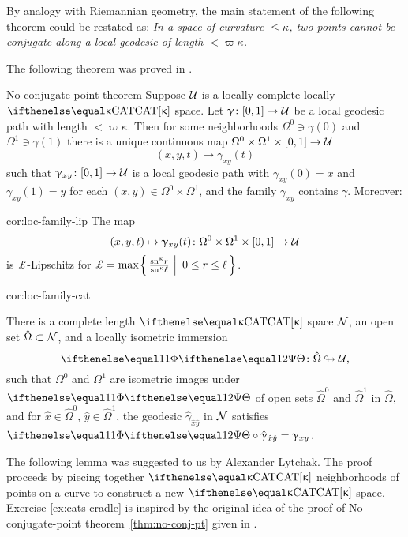 By analogy with Riemannian geometry, the main statement of the following theorem could be restated as: 
\emph{In a space of curvature $\le\kappa$, two points cannot be conjugate along a local geodesic of length $<\varpi\kappa$.}

The following theorem was proved in \cite{a-b:h-c}.

\begin{thm}{No-conjugate-point theorem}
\label{thm:no-conj-pt}
Suppose $\mathcal{U}$ is a locally complete locally $\CAT\kappa$ space.
Let $\gamma\:[0,1]\to\spc{U}$ be a local geodesic path with length $<\varpi\kappa$.
Then for some neighborhoods $\Omega^0\ni \gamma(0)$ and $\Omega^1\ni\gamma(1)$ 
there is a unique continuous map $\Omega^0\times \Omega^1\times[0,1]\to\spc{U}$
\[(x,y,t)\mapsto\gamma_{x y}(t)\]
such that 
$\gamma_{x y}\:[0,1]\to\spc{U}$ is a local geodesic path with 
$\gamma_{x y}(0)=x$ and 
$\gamma_{x y}(1)=y$ for each $(x,y)\in\Omega^0\times\Omega^1$,
and the family $\gamma_{x y}$ contains $\gamma$.  Moreover:

\begin{subthm}{cor:loc-family-lip}
The map 
\[(x,y,t)\mapsto\gamma_{x y}(t)\:\Omega^0\times\Omega^1\times[0,1]\to\spc{U}\] 
is $\Lip$-Lipschitz
for 
$\Lip=\max\set{\tfrac{\sn\kappa r}{\sn\kappa \ell}}{0\le r\le \ell}$.
\end{subthm}

\begin{subthm}{cor:loc-family-cat}

There is a complete length $\CAT\kappa$ space $\mathcal{N}$, an open set $\hat\Omega\subset \spc{N}$,
and a locally isometric immersion 
\[\map\:\hat\Omega\looparrowright\spc{U},\]
such that $\Omega^0$ and $\Omega^1$ are isometric images under $\map$ of open sets $\hat\Omega^0$ and $\hat\Omega^1$ in $\hat\Omega$, and for $\hat x\in\hat\Omega^0$, $\hat y\in\hat\Omega^1$, the geodesic $\hat\gamma_{\hat x \hat y}$ in $\mathcal{N}$ satisfies $\map\circ\hat\gamma_{\hat x \hat y}=\gamma_{xy}$.
\end{subthm}
\end{thm}

The following lemma was suggested to us by Alexander Lytchak.
The proof proceeds by piecing together $\CAT{\kappa}$  neighborhoods of points on a curve to construct a new $\CAT{\kappa}$ space.  
Exercise \ref{ex:cats-cradle} is inspired by the original idea of the proof of No-conjugate-point theorem~\ref{thm:no-conj-pt} given in \cite{a-b:h-c}.

